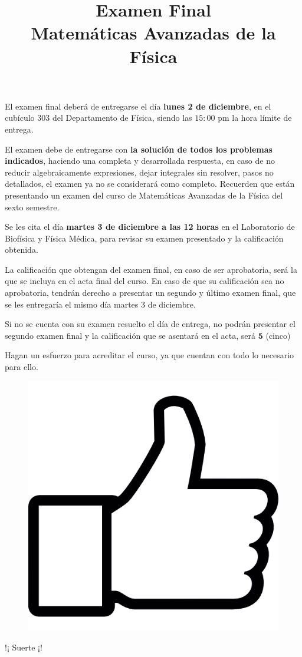 
\author{}
\title{Examen Final \\ \large{Matemáticas Avanzadas de la Física} \vspace{-50pt}}
\date{}

\setlength{\parskip}{5mm}
\renewcommand\labelenumii{\theenumi.{\arabic{enumii})}}
\maketitle
\fontsize{14}{14}\selectfont
El examen final deberá de entregarse el día \textbf{lunes 2 de diciembre}, en el cubículo $303$ del Departamento de Física, siendo las $15:00$ pm la hora límite de entrega.
\par
El examen debe de entregarse con \textbf{la solución de todos los problemas indicados}, haciendo una completa y desarrollada respuesta, en caso de no reducir algebraicamente expresiones, dejar integrales sin resolver, pasos no detallados, el examen ya no se considerará como completo. Recuerden que están presentando un examen del curso de Matemáticas Avanzadas de la Física del sexto semestre.
\par
Se les cita el día \textbf{martes 3 de diciembre a las 12 horas} en el Laboratorio de Biofísica y Física Médica, para revisar su examen presentado y la calificación obtenida.
\par
La calificación que obtengan del examen final, en caso de ser aprobatoria, será la que se incluya en el acta final del curso. En caso de que su calificación sea no aprobatoria, tendrán derecho a presentar un segundo y último examen final, que se les entregaría el mismo día martes 3 de diciembre.
\par
Si no se cuenta con su examen resuelto el día de entrega, no podrán presentar el segundo examen final y la calificación que se asentará en el acta, será $\mathbf{5}$ (cinco)
\par
Hagan un esfuerzo para acreditar el curso, ya que cuentan con todo lo necesario para ello. 
\begin{figure}[H]
\includegraphics[scale=0.4]{./Imagenes/pulgar_arriba.png}
\end{figure}
!¡ Suerte ¡!
